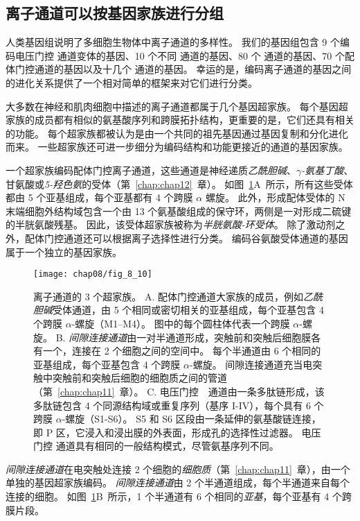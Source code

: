 \subsection{离子通道可以按基因家族进行分组}

人类基因组说明了多细胞生物体中离子通道的多样性。 我们的基因组包含 9 个编码电压门控  通道变体的基因、10 个不同  通道的基因、80 个  通道的基因、70 个配体门控通道的基因以及十几个  通道的基因。
幸运的是，编码离子通道的基因之间的进化关系提供了一个相对简单的框架来对它们进行分类。


大多数在神经和肌肉细胞中描述的离子通道都属于几个基因超家族。
每个基因超家族的成员都有相似的氨基酸序列和跨膜拓扑结构，更重要的是，它们还具有相关的功能。
每个超家族都被认为是由一个共同的祖先基因通过基因复制和分化进化而来。
一些超家族还可进一步细分为编码结构和功能更接近的通道的基因家族。


一个超家族编码配体门控离子通道，这些通道是神经递质\textit{乙酰胆碱}、\textit{$\gamma$-氨基丁酸}、甘氨酸或\textit{5-羟色氨}的受体（第~\ref{chap:chap12}~章）。 
如图~\ref{fig:8_10}A~所示，所有这些受体都由 5 个亚基组成，每个亚基都有 4 个跨膜 $\alpha$ 螺旋。
此外，形成配体受体的 N 末端细胞外结构域包含一个由 13 个氨基酸组成的保守环，两侧是一对形成二硫键的半胱氨酸残基。
因此，该受体超家族被称为\textit{半胱氨酸-环受体}。
除了激动剂之外，配体门控通道还可以根据离子选择性进行分类。
编码谷氨酸受体通道的基因属于一个独立的基因家族。


\begin{figure}[htbp]
	\centering
	\texttt{[image: chap08/fig\_8\_10]}
	\caption{离子通道的 3 个超家族。
		A. 配体门控通道大家族的成员，例如\textit{乙酰胆碱}受体通道，由 5 个相同或密切相关的亚基组成，每个亚基包含 4 个跨膜 $\alpha$-螺旋（M1–M4）。
		图中的每个圆柱体代表一个跨膜 $\alpha$-螺旋。
		B. \textit{间隙连接通道}由一对半通道形成，突触前和突触后细胞膜各有一个，连接在 2 个细胞之间的空间中。
		每个半通道由 6 个相同的亚基组成，每个亚基包含 4 个跨膜 $\alpha$-螺旋。
		间隙连接通道充当电突触中突触前和突触后细胞的细胞质之间的管道（第~\ref{chap:chap11}~章）。
		C. 电压门控~~通道由一条多肽链形成，该多肽链包含 4 个同源结构域或重复序列（基序 I-IV），每个具有 6 个跨膜 $\alpha$-螺旋（S1-S6）。
		S5 和 S6 区段由一条延伸的氨基酸链连接，即 P 区，它浸入和浸出膜的外表面，形成孔的选择性过滤器。
		电压门控  通道具有相同的一般结构模式，尽管氨基序列不同。}
	\label{fig:8_10}
\end{figure}




\textit{间隙连接通道}在电突触处连接 2 个细胞的\textit{细胞质}（第~\ref{chap:chap11}~章），由一个单独的基因超家族编码。
\textit{间隙连接通道}由 2 个半通道组成，每个半通道来自每个连接的细胞。
如图~\ref{fig:8_10}B~所示，1 个半通道有 6 个相同的\textit{亚基}，每个亚基有 4 个跨膜片段。


